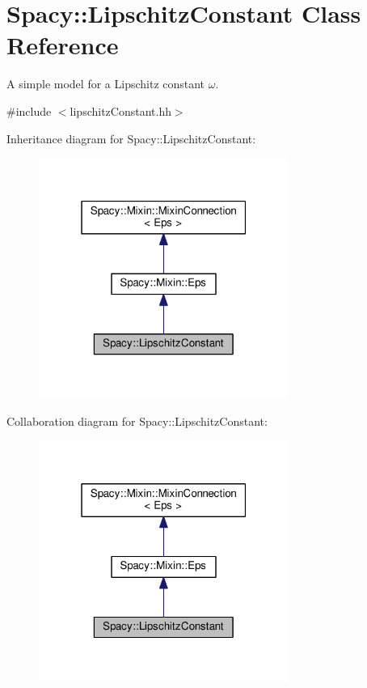 \hypertarget{classSpacy_1_1LipschitzConstant}{}\section{Spacy\+:\+:Lipschitz\+Constant Class Reference}
\label{classSpacy_1_1LipschitzConstant}


A simple model for a Lipschitz constant $\omega$.  




{\ttfamily \#include $<$lipschitz\+Constant.\+hh$>$}



Inheritance diagram for Spacy\+:\+:Lipschitz\+Constant\+:\nopagebreak
\begin{figure}[H]
\begin{center}
\leavevmode
\includegraphics[width=232pt]{classSpacy_1_1LipschitzConstant__inherit__graph}
\end{center}
\end{figure}


Collaboration diagram for Spacy\+:\+:Lipschitz\+Constant\+:\nopagebreak
\begin{figure}[H]
\begin{center}
\leavevmode
\includegraphics[width=232pt]{classSpacy_1_1LipschitzConstant__coll__graph}
\end{center}
\end{figure}
